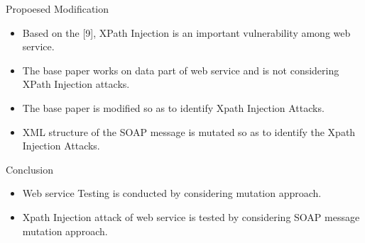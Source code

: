 \documentclass[10pt]{beamer}
\begin{document}
\begin{frame}{}
	\begin{block}{Propoesed Modification}
		\begin{itemize}
			\item Based on the [9], XPath Injection is an important vulnerability among web service.
			\item The base paper works on data part of web service and is not considering XPath Injection attacks.
			\item The base paper is modified so as to identify Xpath Injection Attacks.
			\item XML structure of the SOAP message is mutated so as to identify the Xpath Injection Attacks.
		\end{itemize}
	\end{block}
	
\end{frame}
\begin{frame}{Conclusion}{}
	\begin{block}{}


	\begin{itemize}
		\item Web service Testing is conducted by considering mutation approach.
		\item Xpath Injection attack of web service is tested by considering SOAP message mutation approach.
		
	\end{itemize}
		\end{block}
\end{frame}
\end{document}
